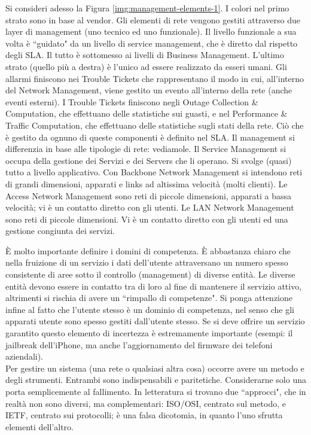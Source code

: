 Si consideri adesso la Figura \ref{img:management-elements-1}. I colori nel primo strato sono in base al vendor. Gli elementi di rete vengono gestiti attraverso due layer di management (uno tecnico ed uno funzionale). Il livello funzionale a sua volta è \textquotedblleft guidato" da un livello di service management, che è diretto dal rispetto degli SLA. Il tutto è sottomesso ai livelli di Business Management. L'ultimo strato (quello più a destra) è l'unico ad essere realizzato da esseri umani. Gli allarmi finiscono nei Trouble Tickets che rappresentano il modo in cui, all'interno del Network Management, viene gestito un evento all'interno della rete (anche eventi esterni). I Trouble Tickets finiscono negli Outage Collection \& Computation, che effettuano delle statistiche sui guasti, e nel Performance \& Traffic Computation, che effettuano delle statistiche sugli stati della rete. Ciò che è gestito da ognuno di queste componenti è definito nel SLA. Il management si differenzia in base alle tipologie di rete: vediamole. Il Service Management si occupa della gestione dei Servizi e dei Servers che li operano. Si svolge (quasi) tutto a livello applicativo. Con Backbone Network Management si intendono reti di grandi dimensioni, apparati e links ad altissima velocità (molti clienti). Le Access Network Management sono reti di piccole dimensioni, apparati a bassa velocità; vi è un contatto diretto con gli utenti. Le LAN Network Management sono reti di piccole dimensioni. Vi è un contatto diretto con gli utenti ed una gestione congiunta dei servizi.

È molto importante definire i domini di competenza. È abbastanza chiaro che nella fruizione di un servizio i dati dell'utente attraversano un numero spesso consistente di aree sotto il controllo (management) di diverse entità. Le diverse entità devono essere in contatto tra di loro al fine di mantenere il servizio attivo, altrimenti si rischia di avere un \textquotedblleft rimpallo di competenze". Si ponga attenzione infine al fatto che l'utente stesso è un dominio di competenza, nel senso che gli apparati utente sono spesso gestiti dall'utente stesso. Se si deve offrire un servizio garantito questo elemento di incertezza è estremamente importante (esempi: il jailbreak dell'iPhone, ma anche l'aggiornamento del firmware dei telefoni aziendali).\\
Per gestire un sistema (una rete o qualsiasi altra cosa) occorre avere un metodo e degli strumenti. Entrambi sono indispensabili e paritetiche. Considerarne solo una porta semplicemente al fallimento. In letteratura si trovano due \textquotedblleft approcci", che in realtà non sono diversi, ma complementari: ISO/OSI, centrato sul metodo, e IETF, centrato sui protocolli; è una falsa dicotomia, in quanto l'uno sfrutta elementi dell'altro.

